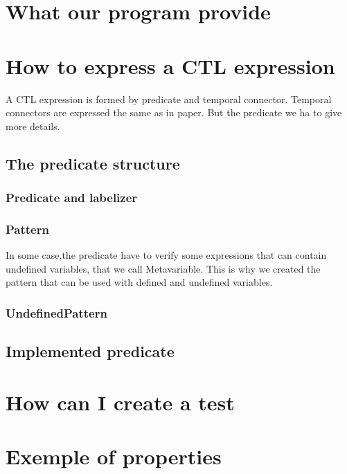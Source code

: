 \documentclass{report}
\begin{document}
\tableofcontents
{}


\chapter{What our program provide}

    \chapter{How to express a CTL expression}
    A CTL expression is formed by predicate and temporal connector. Temporal connectors are expressed the same as in paper. But the predicate we ha to give more details.
    
    \section{The predicate structure}
        \subsection{Predicate and labelizer}
        
        \subsection{Pattern}
        In some case,the predicate have to verify some expressions that can contain undefined variables, that we call Metavariable. This is why we created the pattern that can be used with defined and undefined variables. 
        \subsection{UndefinedPattern}
        \subsection{}
    \section{Implemented predicate}


    \chapter{How can I create a test}
    \chapter{Exemple of properties}
\end{document}
